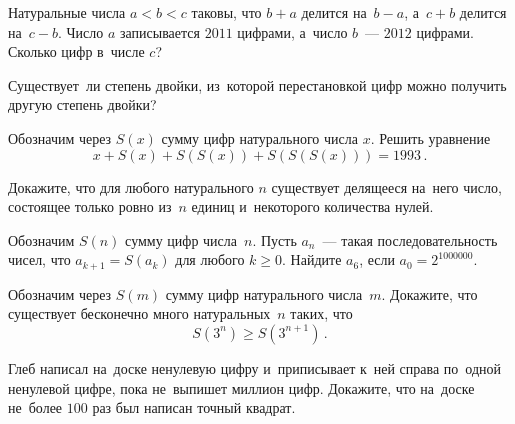 \begin{problems}

\item
Натуральные числа $a < b < c$ таковы, что $b + a$ делится на~$b - a$,
а~$c + b$ делится на~$c - b$.
Число $a$ записывается $2011$ цифрами, а~число $b$~--- $2012$ цифрами.
Сколько цифр в~числе $c$?


\item
Существует~ли степень двойки, из~которой перестановкой цифр можно получить
другую степень двойки?

\item
Обозначим через $S(x)$ сумму цифр натурального числа $x$.
Решить уравнение
\[
    x + S(x) + S(S(x)) + S(S(S(x))) = 1993
\,.\]

\item
Докажите, что для любого натурального $n$ существует делящееся на~него число,
состоящее только ровно из~$n$ единиц и~некоторого количества нулей.

Обозначим $S(n)$ сумму цифр числа~$n$.
Пусть $a_n$~--- такая последовательность чисел, что $a_{k+1} = S(a_k)$ для
любого $k \geq 0$.
Найдите $a_6$, если $a_0 = 2^{1000000}$.

\item
Обозначим через $S(m)$ сумму цифр натурального числа~$m$.
Докажите, что существует бесконечно много натуральных~$n$ таких, что
\[
    S(3^n) \geq S(3^{n+1})
\,.\]



\item
Глеб написал на~доске ненулевую цифру и~приписывает к~ней справа по~одной
ненулевой цифре, пока не~выпишет миллион цифр.
Докажите, что на~доске не~более $100$ раз был написан точный квадрат. 

\end{problems}

